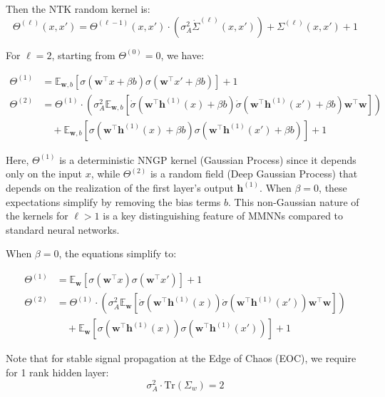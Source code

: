 \documentclass[11pt, a4paper]{article}
\begin{document}
Then the NTK random kernel is:
\begin{equation}
    \Theta^{(\ell)}(x, x') = \Theta^{(\ell-1)}(x, x') \cdot \left(\sigma_A^2\dot{\Sigma}^{(\ell)}(x, x')\right) + \Sigma^{(\ell)}(x, x') +1
\end{equation}

For $\ell=2$, starting from $\Theta^{(0)} = 0$, we have:

\begin{align*}
    \Theta^{(1)} &= \mathbb{E}_{\bm{w}, b} \left[ \sigma(\bm{w}^\top x + \beta b) \sigma(\bm{w}^\top x' + \beta b) \right] + 1 \\
    \Theta^{(2)} &= \Theta^{(1)} \cdot \left(\sigma_A^2 \mathbb{E}_{\bm{w}, b} \left[ \dot{\sigma}(\bm{w}^\top \bm{h}^{(1)}(x) + \beta b) \dot{\sigma}(\bm{w}^\top \bm{h}^{(1)}(x') + \beta b) \bm{w}^\top\bm{w} \right]\right) \\
    &\quad + \mathbb{E}_{\bm{w}, b} \left[ \sigma(\bm{w}^\top \bm{h}^{(1)}(x) + \beta b) \sigma(\bm{w}^\top \bm{h}^{(1)}(x') + \beta b) \right] + 1
\end{align*}

Here, $\Theta^{(1)}$ is a deterministic NNGP kernel (Gaussian Process) since it depends only on the input $x$, while $\Theta^{(2)}$ is a random field (Deep Gaussian Process) that depends on the realization of the first layer's output $\bm{h}^{(1)}$. When $\beta = 0$, these expectations simplify by removing the bias terms $b$. This non-Gaussian nature of the kernels for $\ell > 1$ is a key distinguishing feature of MMNNs compared to standard neural networks.

\newline
When $\beta = 0$, the equations simplify to:
\begin{tcolorbox}[title=Main focus: NTK kernels with $\beta=0$]
\begin{align*}
    \Theta^{(1)} &= \mathbb{E}_{\bm{w}} \left[ \sigma(\bm{w}^\top x) \sigma(\bm{w}^\top x') \right] + 1 \\
    \Theta^{(2)} &= \Theta^{(1)} \cdot \left(\sigma_A^2 \mathbb{E}_{\bm{w}} \left[ \dot{\sigma}(\bm{w}^\top \bm{h}^{(1)}(x)) \dot{\sigma}(\bm{w}^\top \bm{h}^{(1)}(x')) \bm{w}^\top\bm{w} \right]\right) \\
    &\quad + \mathbb{E}_{\bm{w}} \left[ \sigma(\bm{w}^\top \bm{h}^{(1)}(x)) \sigma(\bm{w}^\top \bm{h}^{(1)}(x')) \right] + 1
\end{align*}
\end{tcolorbox}

Note that for stable signal propagation at the Edge of Chaos (EOC), we require for 1 rank hidden layer:
\begin{equation*}
    \sigma_A^2 \cdot \text{Tr}(\Sigma_w) = 2
\end{equation*}
\end{document}
